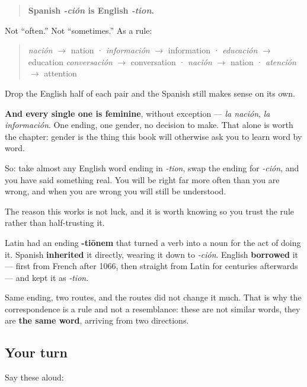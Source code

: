 \begin{grammarlens}[title={Grammar Lens: an ending that translates itself}]
\begin{quote}
\textbf{Spanish \emph{-ción} is English \emph{-tion}.}
\end{quote}

Not \textquotedblleft{}often.\textquotedblright{} Not \textquotedblleft{}sometimes.\textquotedblright{} As a rule:

\begin{quote}
\emph{nación} $\to$ nation · \emph{información} $\to$ information · \emph{educación} $\to$ education \emph{conversación} $\to$ conversation · \emph{nación} $\to$ nation · \emph{atención} $\to$ attention
\end{quote}

Drop the English half of each pair and the Spanish still makes sense on its own.

\textbf{And every single one is feminine}, without exception — \emph{la nación}, \emph{la información}. One ending, one gender, no decision to make. That alone is worth the chapter: gender is the thing this book will otherwise ask you to learn word by word.

So: take almost any English word ending in \emph{-tion}, swap the ending for \emph{-ción}, and you have said something real. You will be right far more often than you are wrong, and when you are wrong you will still be understood.
\end{grammarlens}

\begin{cousinweb}
The reason this works is not luck, and it is worth knowing so you trust the rule rather than half-trusting it.

Latin had an ending \textbf{-tiōnem} that turned a verb into a noun for the act of doing it. Spanish \textbf{inherited} it directly, wearing it down to \emph{-ción}. English \textbf{borrowed} it — first from French after 1066, then straight from Latin for centuries afterwards — and kept it as \emph{-tion}.

Same ending, two routes, and the routes did not change it much. That is why the correspondence is a rule and not a resemblance: these are not similar words, they are \textbf{the same word}, arriving from two directions.
\end{cousinweb}

\subsection*{Your turn}
Say these aloud:

